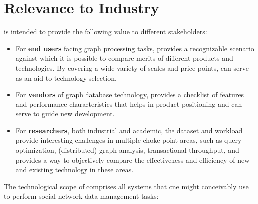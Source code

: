 
\section{Relevance to Industry}

\ldbcsnb is intended to provide the following value to different stakeholders:

\begin{itemize}
 \item For \textbf{end users} facing graph processing tasks, \ldbcsnb provides
     a recognizable scenario against which it is possible to compare merits of
     different products and technologies.  By covering a wide variety of scales
     and price points, \ldbcsnb can serve as an aid to technology selection.
 \item For \textbf{vendors} of graph database technology, \ldbcsnb provides a
     checklist of features and performance characteristics that helps in
     product positioning and can serve to guide new development.
 \item For \textbf{researchers}, both industrial and academic, the \ldbcsnb
     dataset and workload provide interesting challenges in multiple
     choke-point areas, such as query optimization, (distributed) graph
     analysis, transactional throughput, and provides a way to objectively
     compare the effectiveness and efficiency of new and existing technology in
     these areas.
\end{itemize}

The technological scope of \ldbcsnb comprises all systems that one might
conceivably use to perform social network data management tasks:

